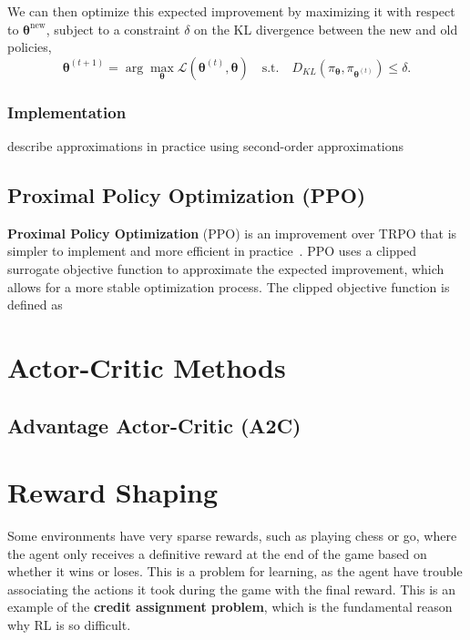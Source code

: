 \documentclass[12pt]{report}
\theoremstyle{definition}
\theoremstyle{remark}
\begin{document}
We can then optimize this expected improvement by maximizing it with respect to $\boldsymbol{\theta}^\text{new}$, subject to a constraint $\delta$ on the KL divergence between the new and old policies,
\begin{equation}
    \boldsymbol{\theta}^{(t+1)} = \arg\max_{\boldsymbol{\theta}} \mathcal{L}(\boldsymbol{\theta}^{(t)}, \boldsymbol{\theta}) \quad \text{s.t.} \quad D_{KL}\left(\pi_{\boldsymbol{\theta}}, \pi_{\boldsymbol{\theta}^{(t)}}\right) \leq \delta.
\end{equation}

\subsubsection{Implementation}

describe approximations in practice using second-order approximations

\subsection{Proximal Policy Optimization (PPO)}
\textbf{Proximal Policy Optimization} (PPO) is an improvement over TRPO that is simpler to implement and more efficient in practice~\cite{schulman_proximal_2017}. PPO uses a clipped surrogate objective function to approximate the expected improvement, which allows for a more stable optimization process. The clipped objective function is defined as

\section{Actor-Critic Methods}

\subsection{Advantage Actor-Critic (A2C)}

\section{Reward Shaping}
Some environments have very sparse rewards, such as playing chess or go, where the agent only receives a definitive reward at the end of the game based on whether it wins or loses. This is a problem for learning, as the agent have trouble associating the actions it took during the game with the final reward. This is an example of the \textbf{credit assignment problem}, which is the fundamental reason why RL is so difficult.
\end{document}

